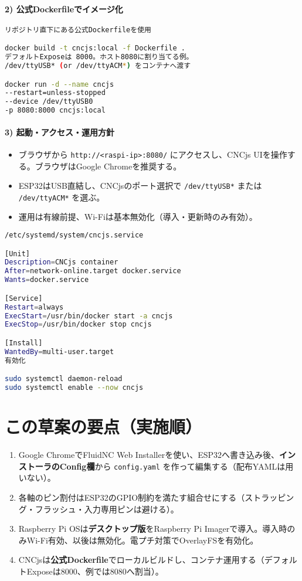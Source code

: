 \documentclass[uplatex,dvipdfmx]{ujarticle}
\begin{document}
\paragraph{2) 公式Dockerfileでイメージ化}
\begin{lstlisting}[caption=Dockerビルドと起動, label=code:docker-run, language=bash]
リポジトリ直下にある公式Dockerfileを使用

docker build -t cncjs:local -f Dockerfile .
デフォルトExposeは 8000。ホスト8080に割り当てる例。
/dev/ttyUSB* (or /dev/ttyACM*) をコンテナへ渡す

docker run -d --name cncjs
--restart=unless-stopped
--device /dev/ttyUSB0
-p 8080:8000 cncjs:local
\end{lstlisting}

\paragraph{3) 起動・アクセス・運用方針}
\begin{itemize}
\item ブラウザから \texttt{http://<raspi-ip>:8080/} にアクセスし、CNCjs UIを操作する。ブラウザはGoogle Chromeを推奨する。
\item ESP32はUSB直結し、CNCjsのポート選択で \texttt{/dev/ttyUSB*} または \texttt{/dev/ttyACM*} を選ぶ。
\item 運用は有線前提、Wi-Fiは基本無効化（導入・更新時のみ有効）。
\end{itemize}

\begin{lstlisting}[caption=systemdで自動起動（コンテナを常駐させる例）, label=code:systemd, language=bash]
/etc/systemd/system/cncjs.service

[Unit]
Description=CNCjs container
After=network-online.target docker.service
Wants=docker.service

[Service]
Restart=always
ExecStart=/usr/bin/docker start -a cncjs
ExecStop=/usr/bin/docker stop cncjs

[Install]
WantedBy=multi-user.target
有効化

sudo systemctl daemon-reload
sudo systemctl enable --now cncjs
\end{lstlisting}

\section{この草案の要点（実施順）}
\begin{enumerate}
\item Google ChromeでFluidNC Web Installerを使い、ESP32へ書き込み後、\textbf{インストーラのConfig欄}から \texttt{config.yaml} を作って編集する（配布YAMLは用いない）。
\item 各軸のピン割付はESP32のGPIO制約を満たす組合せにする（ストラッピング・フラッシュ・入力専用ピンは避ける）。
\item Raspberry Pi OSは\textbf{デスクトップ版}をRaspberry Pi Imagerで導入。導入時のみWi-Fi有効、以後は無効化。電プチ対策でOverlayFSを有効化。
\item CNCjsは\textbf{公式Dockerfile}でローカルビルドし、コンテナ運用する（デフォルトExposeは8000、例では8080へ割当）。
\end{enumerate}
\end{document}
